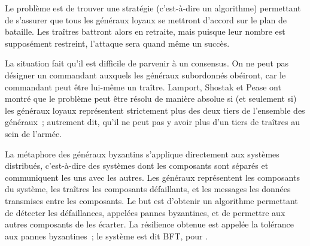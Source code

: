 Le problème est de trouver une stratégie (c'est-à-dire un algorithme) permettant de s'assurer que tous les généraux loyaux se mettront d'accord sur le plan de bataille. Les traîtres battront alors en retraite, mais puisque leur nombre est supposément restreint, l'attaque sera quand même un succès.

La situation fait qu'il est difficile de parvenir à un consensus. On ne peut pas désigner un commandant auxquels les généraux subordonnés obéiront, car le commandant peut être lui-même un traître. Lamport, Shostak et Pease ont montré que le problème peut être résolu de manière absolue si (et seulement si) les généraux loyaux représentent strictement plus des deux tiers de l'ensemble des généraux~; autrement dit, qu'il ne peut pas y avoir plus d'un tiers de traîtres au sein de l'armée.



La métaphore des généraux byzantins s'applique directement aux systèmes distribués, c'est-à-dire des systèmes dont les composants sont séparés et communiquent les uns avec les autres. Les généraux représentent les composants du système, les traîtres les composants défaillants, et les messages les données transmises entre les composants. Le but est d'obtenir un algorithme permettant de détecter les défaillances, appelées pannes byzantines, et de permettre aux autres composants de les écarter. La résilience obtenue est appelée la tolérance aux pannes byzantines~; le système est dit BFT, pour .

